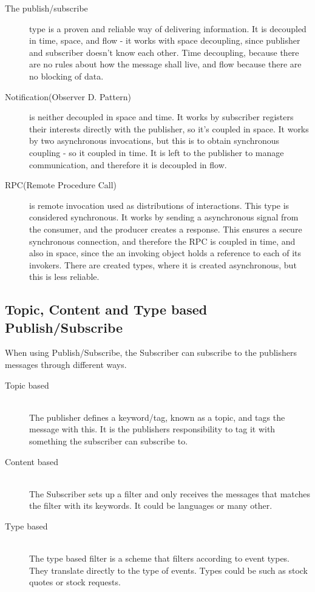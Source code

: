 \begin{description}
\item[The publish/subscribe] type is a proven and reliable way of delivering information. It is decoupled in time, space, and flow - it works with space decoupling, since publisher and subscriber doesn't know each other. Time decoupling, because there are no rules about how the message shall live, and flow because there are no blocking of data. \\

\item[Notification(Observer D. Pattern)] is neither decoupled in space and time. It works by subscriber registers their interests directly with the publisher, so it's coupled in space. It works by two asynchronous invocations, but this is to obtain synchronous coupling - so it coupled in time. It is left to the publisher to manage communication, and therefore it is decoupled in flow.\\

\item[RPC(Remote Procedure Call)] is remote invocation used as distributions of interactions. This type is considered synchronous. It works by sending a asynchronous signal from the consumer, and the producer creates a response. This ensures a secure synchronous connection, and therefore the RPC is coupled in time, and also in space, since the an invoking object holds a reference to each of its invokers. There are created types, where it is created asynchronous, but this is less reliable.\\

\end{description}

\subsection{Topic, Content and Type based Publish/Subscribe}
When using Publish/Subscribe, the Subscriber can subscribe to the publishers messages through different ways.

\begin{description}
    \item[Topic based] \hfill \\
 The publisher defines a keyword/tag, known as a topic, and tags the message with this. It is the publishers responsibility to tag it with something the subscriber can subscribe to.
    \item[Content based] \hfill \\
 The Subscriber sets up a filter and only receives the messages that matches the filter with its keywords. It could be languages or many other.
    \item[Type based] \hfill \\
 The type based filter is a scheme that filters according to event types. They translate directly to the type of events. Types could be such as stock quotes or stock requests.
 \end{description} 